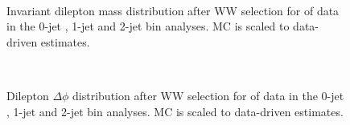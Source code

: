 \begin{figure}[!hbtp]
\centering
\subfigure[]{
\centering
\label{subfig:ww_dilmass_0j}
}
\subfigure[]{
\centering
\label{subfig:ww_dilmass_1j}
}
\subfigure[]{
\centering
\label{subfig:ww_dilmass_2j}
} \\
\caption{Invariant dilepton mass distribution after WW selection for \intlumiEightTeV of data in the 0-jet , 
1-jet  and 2-jet  bin analyses. 
MC is scaled to data-driven estimates.}
\label{fig:ww_dilmass}
\end{figure}

\begin{figure}[!hbtp]
\centering
\subfigure[]{
\centering
\label{subfig:ww_deltaphi_0j}
}
\subfigure[]{
\centering
\label{subfig:ww_deltaphi_1j}
}
\subfigure[]{
\centering
\label{subfig:ww_deltaphi_2j}
} \\
\caption{Dilepton $\Delta\phi$ distribution after WW selection for \intlumiEightTeV of data in the 0-jet , 
1-jet  and 2-jet  bin analyses. 
MC is scaled to data-driven estimates.}
\label{fig:ww_deltaphi}
\end{figure}

\clearpage


